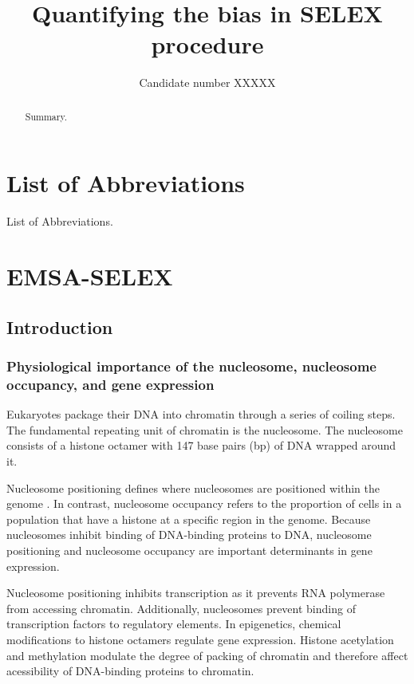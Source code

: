 \documentclass[parskip=full, numbers=noenddot]{scrreprt}
\title{Quantifying the bias in SELEX procedure}
\author{Candidate number XXXXX}
\begin{document}
\maketitle

\begin{abstract}
 
Summary.
 
\end{abstract}

\tableofcontents

\chapter*{List of Abbreviations}
\label{ch:abbrev}

List of Abbreviations.

\chapter{EMSA-SELEX}
\label{ch:emsaselex}

\section{Introduction}
\label{sec:emsaselex_intro}

\subsection{Physiological importance of the nucleosome, nucleosome occupancy, and gene expression}
\label{ssec:emsaselex_intro_importance}

Eukaryotes package their DNA into chromatin through a series of coiling steps.  The fundamental repeating unit of chromatin is the nucleosome.  The nucleosome consists of a histone octamer with 147 base pairs (bp) of DNA wrapped around it.

Nucleosome positioning defines where nucleosomes are positioned within the genome \citep{struhl_determinants_2013}.  In contrast, nucleosome occupancy refers to the proportion of cells in a population that have a histone at a specific region in the genome.  Because nucleosomes inhibit binding of DNA-binding proteins to DNA, nucleosome positioning and nucleosome occupancy are important determinants in gene expression.

Nucleosome positioning inhibits transcription as it prevents RNA polymerase from accessing chromatin.  Additionally, nucleosomes prevent binding of transcription factors to regulatory elements.  In epigenetics, chemical modifications to histone octamers regulate gene expression.  Histone acetylation and methylation modulate the degree of packing of chromatin and therefore affect acessibility of DNA-binding proteins to chromatin.
\end{document}
